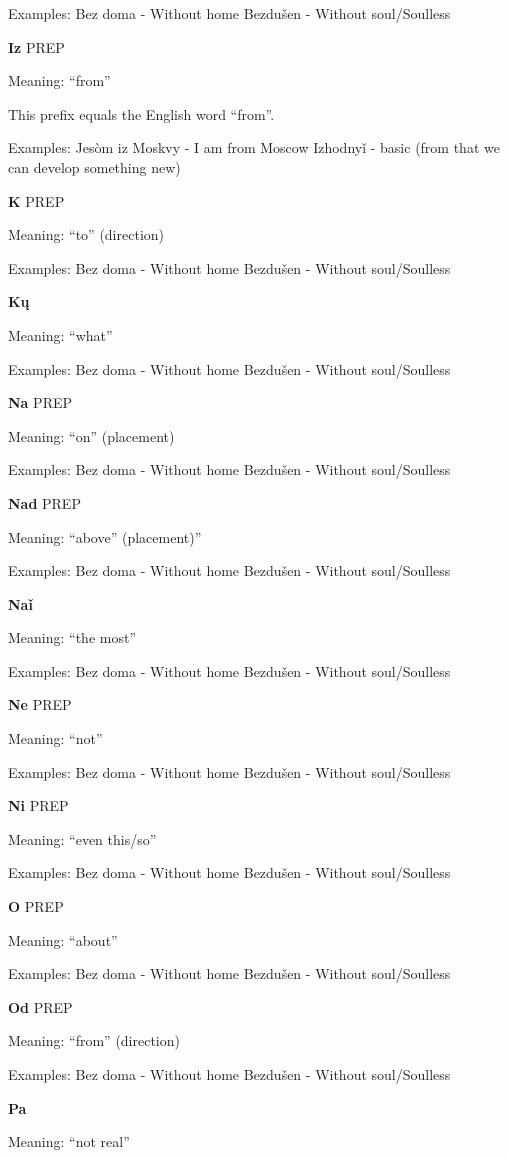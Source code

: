 Examples:
Bez doma - Without home
Bezdušen - Without soul/Soulless 

\textbf{Iz} PREP

Meaning: “from”

This prefix equals the English word “from”. 

Examples:
Jesòm iz Moskvy - I am from Moscow
Izhodnyǐ - basic (from that we can develop something new)

\textbf{K} PREP

Meaning: “to” (direction)

Examples:
Bez doma - Without home
Bezdušen - Without soul/Soulless 

\textbf{Kų}

Meaning: “what”

Examples:
Bez doma - Without home
Bezdušen - Without soul/Soulless 

\textbf{Na} PREP

Meaning: “on” (placement)

Examples:
Bez doma - Without home
Bezdušen - Without soul/Soulless 

\textbf{Nad} PREP

Meaning: “above” (placement)”

Examples:
Bez doma - Without home
Bezdušen - Without soul/Soulless 

\textbf{Naǐ}

Meaning: “the most”

Examples:
Bez doma - Without home
Bezdušen - Without soul/Soulless 


\textbf{Ne} PREP

Meaning: “not”

Examples:
Bez doma - Without home
Bezdušen - Without soul/Soulless 

\textbf{Ni} PREP

Meaning: “even this/so”

Examples:
Bez doma - Without home
Bezdušen - Without soul/Soulless 

\textbf{O}  PREP

Meaning: “about”

Examples:
Bez doma - Without home
Bezdušen - Without soul/Soulless 

\textbf{Od} PREP

Meaning: “from” (direction)

Examples:
Bez doma - Without home
Bezdušen - Without soul/Soulless 

\textbf{Pa}

Meaning: “not real”


